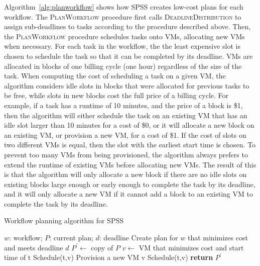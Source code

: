 \documentclass{sig-alternate}
\begin{document}
Algorithm~\ref{alg:planworkflow} shows how SPSS creates low-cost plans for
each workflow. The \textsc{PlanWorkflow} procedure first calls 
\textsc{DeadlineDistribution} to assign sub-deadlines to tasks according
to the procedure described above. Then, the \textsc{PlanWorkflow} procedure
schedules tasks onto VMs, allocating new VMs when necessary. For each task 
in the workflow, the the least expensive slot is chosen to schedule the 
task so that it can be completed by  its deadline. VMs are allocated in 
blocks of one billing cycle (one hour) regardless of the size of the task. 
When computing the cost of scheduling a task on a given VM, the algorithm 
considers idle slots in blocks that were allocated for previous tasks to be 
free, while slots in new blocks cost the full price of a billing cycle. For 
example, if a task has a runtime of 10 minutes, and the price of a block is 
\$1, then the algorithm will either schedule the task on 
an existing VM that has an idle slot larger than 10 minutes for a cost of \$0, 
or it will allocate a new block on an existing VM, or provision a new VM, for 
a cost of \$1. If the cost of slots on two different VMs is equal, then the 
slot with the earliest start time is chosen. To prevent too many VMs from 
being provisioned, the algorithm always prefers to extend the runtime of 
existing VMs before allocating new VMs. The result of this is that the 
algorithm will only allocate a new block if there are no idle slots on 
existing blocks large enough or early enough to complete the 
task by its deadline, and it will only allocate a new VM if it cannot add 
a block to an existing VM to complete the task by its deadline.

\begin{algorithm}
\caption{Workflow planning algorithm for SPSS}
\label{alg:planworkflow}
\begin{algorithmic}[1]
\Require $w$: workflow; $P$: current plan; $d$: deadline
\Ensure Create plan for $w$ that minimizes cost and meets deadline $d$
    \State $P^\prime\gets$ copy of $P$
    \State {}
        \State $v \gets$ VM that minimizes cost and start time of t
            \State Schedule(t,v)
        \Else
            \State Provision a new VM v
            \State Schedule(t,v)
        \EndIf
    \EndFor
    \State \textbf{return} $P^\prime$
\EndProcedure
\end{algorithmic}
\end{algorithm}
\end{document}
